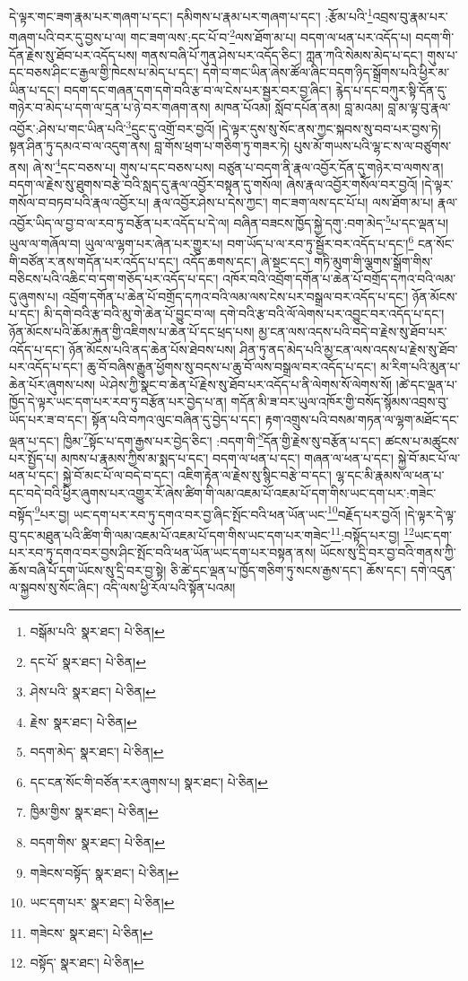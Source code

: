དེ་ལྟར་གང་ཟག་རྣམ་པར་གཞག་པ་དང་། དམིགས་པ་རྣམ་པར་གཞག་པ་དང་། :རྩོམ་པའི་\footnote{བསྒོམ་པའི་  སྣར་ཐང་།  པེ་ཅིན། }འབྲས་བུ་རྣམ་པར་གཞག་པའི་བར་དུ་བྱས་པ་ལ། གང་ཟག་ལས་:དང་པོ་བ་\footnote{དང་པོ་  སྣར་ཐང་།  པེ་ཅིན། }ལས་ཐོག་མ་པ། བདག་ལ་ཕན་པར་འདོད་པ། བདག་གི་དོན་རྗེས་སུ་ཐོབ་པར་འདོད་པས། གནས་བཞི་པོ་ཀུན་ཤེས་པར་འདོད་ཅིང་། ཀླན་ཀའི་སེམས་མེད་པ་དང་། གུས་པ་དང་བཅས་ཤིང་ང་རྒྱལ་གྱི་ཁེངས་པ་མེད་པ་དང་། དགེ་བ་གང་ཡིན་ཞེས་ཚོལ་ཞིང་བདག་ཉིད་སྒྲོགས་པའི་ཕྱིར་མ་ཡིན་པ་དང་། བདག་དང་གཞན་དག་དགེ་བའི་རྩ་བ་ལ་ངེས་པར་སྦྱར་བར་བྱ་ཞིང་། རྙེད་པ་དང་བཀུར་སྟི་དོན་དུ་གཉེར་བ་མེད་པ་དག་ལ་དྲན་པ་ཉེ་བར་གཞག་ནས། མཁན་པོའམ། སློབ་དཔོན་ནམ། བླ་མའམ། བླ་མ་ལྟ་བུ་རྣལ་འབྱོར་:ཤེས་པ་གང་ཡིན་པའི་\footnote{ཤེས་པའི་  སྣར་ཐང་།  པེ་ཅིན། }དྲུང་དུ་འགྲོ་བར་བྱའོ། །དེ་ལྟར་དུས་སུ་སོང་ནས་ཀྱང་སྐབས་སུ་བབ་པར་བྱས་ཏེ། སྟན་ཤིན་ཏུ་དམའ་བ་ལ་འདུག་ནས། བླ་གོས་ཕྲག་པ་གཅིག་ཏུ་གཟར་ཏེ། པུས་མོ་གཡས་པའི་ལྷ་ང་ས་ལ་བཙུགས་ནས། ཞེ་ས་\footnote{རྗེས་  སྣར་ཐང་།  པེ་ཅིན། }དང་བཅས་པ། གུས་པ་དང་བཅས་པས། བཙུན་པ་བདག་ནི་རྣལ་འབྱོར་དོན་དུ་གཉེར་བ་ལགས་ན། བདག་ལ་རྗེས་སུ་ཐུགས་བརྩེ་བའི་སླད་དུ་རྣལ་འབྱོར་བསྟན་དུ་གསོལ། ཞེས་རྣལ་འབྱོར་གསོལ་བར་བྱའོ། །དེ་ལྟར་གསོལ་བ་བཏབ་པའི་རྣལ་འབྱོར་པ། རྣལ་འབྱོར་ཤེས་པ་དེས་ཀྱང་། གང་ཟག་ལས་དང་པོ་པ། ལས་ཐོག་མ་པ། རྣལ་འབྱོར་ཡིད་ལ་བྱ་བ་ལ་རབ་ཏུ་བརྩོན་པར་འདོད་པ་དེ་ལ། བཞིན་བཟངས་ཁྱོད་སྐྱེ་དགུ་:བག་མེད་\footnote{བདག་མེད་  སྣར་ཐང་།  པེ་ཅིན། }པ་དང་ལྡན་པ། ཡུལ་ལ་གཞོལ་བ། ཡུལ་ལ་ལྷག་པར་ཞེན་པར་གྱུར་པ། བག་ཡོད་པ་ལ་རབ་ཏུ་སྦྱོར་བར་འདོད་པ་དང་།\footnote{དང་ངན་སོང་གི་བཙོན་རར་ཞུགས་པ།  སྣར་ཐང་།  པེ་ཅིན། } ངན་སོང་གི་བཙོན་ར་ནས་གདོན་པར་འདོད་པ་དང་། འདོད་ཆགས་དང་། ཞེ་སྡང་དང་། གཏི་མུག་གི་ལྕགས་སྒྲོག་གིས་བཅིངས་པའི་འཆིང་བ་དག་གཅོད་པར་འདོད་པ་དང་། འཁོར་བའི་འབྲོག་དགོན་པ་ཆེན་པོ་བགྲོད་དཀའ་བའི་ལམ་དུ་ཞུགས་པ། འབྲོག་དགོན་པ་ཆེན་པོ་བགྲོད་དཀའ་བའི་ལམ་ལས་ངེས་པར་བསྒྲལ་བར་འདོད་པ་དང་། ཉོན་མོངས་པ་དང་། མི་དགེ་བའི་རྩ་བའི་མུ་གེ་ཆེན་པོ་བྱུང་བ་ལ། དགེ་བའི་རྩ་བའི་ལོ་ལེགས་པར་འབྱུང་བར་འདོད་པ་དང་། ཉོན་མོངས་པའི་ཆོམ་རྐུན་གྱི་འཇིགས་པ་ཆེན་པོ་དང་ཕྲད་པས། མྱ་ངན་ལས་འདས་པའི་བདེ་བ་རྗེས་སུ་ཐོབ་པར་འདོད་པ་དང་། ཉོན་མོངས་པའི་ནད་ཆེན་པོས་ཐེབས་པས། ཤིན་ཏུ་ནད་མེད་པའི་མྱ་ངན་ལས་འདས་པ་རྗེས་སུ་ཐོབ་པར་འདོད་པ་དང་། ཆུ་བོ་བཞིས་རྒྱུན་ཕྱོགས་སུ་བདས་པ་ཆུ་བོ་ལས་བསྒྲལ་བར་འདོད་པ་དང་། མ་རིག་པའི་མུན་པ་ཆེན་པོར་ཞུགས་པས། ཡེ་ཤེས་ཀྱི་སྣང་བ་ཆེན་པོ་རྗེས་སུ་ཐོབ་པར་འདོད་པ་ནི་ལེགས་སོ་ལེགས་སོ། །ཚེ་དང་ལྡན་པ་ཁྱོད་དེ་ལྟར་ཡང་དག་པར་རབ་ཏུ་བརྩོན་པར་བྱེད་པ་ན། གདོན་མི་ཟ་བར་ཡུལ་འཁོར་གྱི་བསོད་སྙོམས་འབྲས་བུ་ཡོད་པར་ཟ་བ་དང་། སྟོན་པའི་བཀའ་ལུང་བཞིན་དུ་བྱེད་པ་དང་། རྟག་འགྲུས་པའི་བསམ་གཏན་ལ་ལྷག་མཐོང་དང་ལྡན་པ་དང་། ཁྱིམ་\footnote{ཁྱིམ་གྱིས་  སྣར་ཐང་།  པེ་ཅིན། }སྟོང་པ་དག་རྒྱས་པར་བྱེད་ཅིང་། :བདག་གི་\footnote{བདག་གིས་  སྣར་ཐང་།  པེ་ཅིན། }དོན་གྱི་རྗེས་སུ་བརྩོན་པ་དང་། ཚངས་པ་མཚུངས་པར་སྤྱོད་པ། མཁས་པ་རྣམས་ཀྱིས་མ་སྨད་པ་དང་། བདག་ལ་ཕན་པ་དང་། གཞན་ལ་ཕན་པ་དང་། སྐྱེ་བོ་མང་པོ་ལ་ཕན་པ་དང་། སྐྱེ་བོ་མང་པོ་ལ་བདེ་བ་དང་། འཇིག་རྟེན་ལ་རྗེས་སུ་སྙིང་བརྩེ་བ་དང་། ལྷ་དང་མི་རྣམས་ལ་ཕན་པ་དང་བདེ་བའི་ཕྱིར་ཞུགས་པར་འགྱུར་རོ་ཞེས་ཚིག་གི་ལམ་འཇམ་པོ་འཇམ་པོ་དག་གིས་ཡང་དག་པར་:གཟེང་བསྟོད་\footnote{གཟེངས་བསྟོད་  སྣར་ཐང་།  པེ་ཅིན། }པར་བྱ། ཡང་དག་པར་རབ་ཏུ་དགའ་བར་བྱ་ཞིང་སྤོང་བའི་ཕན་ཡོན་ཡང་\footnote{ཡང་དག་པར་  སྣར་ཐང་།  པེ་ཅིན། }བརྗོད་པར་བྱའོ། །དེ་ལྟར་དེ་ལྟ་བུ་དང་མཐུན་པའི་ཚིག་གི་ལམ་འཇམ་པོ་འཇམ་པོ་དག་གིས་ཡང་དག་པར་གཟེང་\footnote{གཟེངས་  སྣར་ཐང་།  པེ་ཅིན། }:བསྟོད་པར་བྱ། \footnote{བསྟོད་  སྣར་ཐང་།  པེ་ཅིན། }ཡང་དག་པར་རབ་ཏུ་དགའ་བར་བྱས་ཤིང་སྤོང་བའི་ཕན་ཡོན་ཡང་དག་པར་བསྟན་ནས། ཡོངས་སུ་དྲི་བར་བྱ་བའི་གནས་ཀྱི་ཆོས་བཞི་པོ་དག་ཡོངས་སུ་དྲི་བར་བྱ་སྟེ། ཅི་ཚེ་དང་ལྡན་པ་ཁྱོད་གཅིག་ཏུ་སངས་རྒྱས་དང་། ཆོས་དང་། དགེ་འདུན་ལ་སྐྱབས་སུ་སོང་ཞིང་། འདི་ལས་ཕྱི་རོལ་པའི་སྟོན་པའམ། 